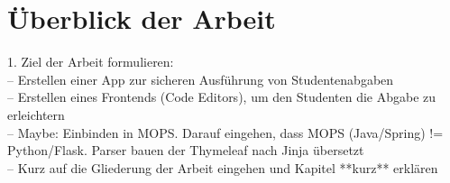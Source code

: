 \section{Überblick der Arbeit}
1. Ziel der Arbeit formulieren:\\
-- Erstellen einer App zur sicheren Ausführung von Studentenabgaben\\
-- Erstellen eines Frontends (Code Editors), um den Studenten die Abgabe zu erleichtern\\
-- Maybe: Einbinden in MOPS. Darauf eingehen, dass MOPS (Java/Spring) != Python/Flask.
Parser bauen der Thymeleaf nach Jinja übersetzt\\
-- Kurz auf die Gliederung der Arbeit eingehen und Kapitel **kurz** erklären\\

